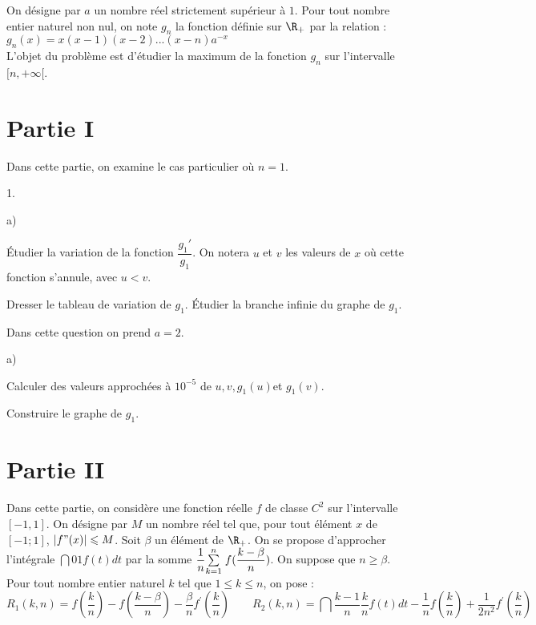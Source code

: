\documentclass[11pt]{article}%
\begin{document}
\noindent On désigne par $a$ un nombre réel strictement supérieur à
$1$.
Pour tout nombre entier naturel non nul, on note $g_{n}$ la fonction
définie
sur $\R_{+}$ par la relation : $g_{n}(x) = x(x-1)(x-2)...(x-n)a^{-x}$\\
L'objet du problème est d'étudier la maximum de la fonction $g_{n}$ sur
l'intervalle $[n, + \infty \lbrack $.

\section*{Partie I}

Dans cette partie, on examine le cas particulier où $n = 1$.

\begin{noliste}{1.}
 \setlength{\itemsep}{4mm}
\item 

\begin{noliste}{a)}
 \setlength{\itemsep}{2mm}
\item Étudier la variation de la fonction $\dfrac{g_{1}{\prime
}}{g_{1}} $.
On notera $u$ et $v$ les valeurs de $x$ où cette fonction s'annule,
avec $u<v $.

\item Dresser le tableau de variation de $g_{1}$. Étudier la branche
infinie
du graphe de $g_{1}$.
\end{noliste}

\item Dans cette question on prend $a = 2$.

\begin{noliste}{a)}
 \setlength{\itemsep}{2mm}
\item Calculer des valeurs approchées à $10^{-5}$ de $u,v,g_{1}(u)$et
$g_{1}(v)$.

\item Construire le graphe de $g_{1}$.
\end{noliste}
\end{noliste}

\section*{Partie II}

Dans cette partie, on considère une fonction réelle $f$ de classe
$C^{2}$
sur l'intervalle $[-1,1]$. On désigne par $M$ un nombre réel tel que,
pour
tout élément $x$ de $[-1;1]$, $\left| f"(x)\right| \leq M$.
Soit $\beta $ un élément de $\R_{+}$. On se propose d'approcher
l'intégrale $\dint{0}{1}f(t)dt$ par la somme $\dfrac{1}{n}\Sum{k =
1}{n}f(\dfrac{k-\beta }{n})$. On suppose que $n\geq 
\beta $. Pour tout nombre entier naturel $k$ tel que $1\leq k\leq n
$, on pose : 
\[
R_{1}(k,n) = f(\dfrac{k}{n})-f(\dfrac{k-\beta }{n})-\dfrac{\beta
}{n}f^{\prime
}(\dfrac{k}{n})\qquad R_{2}(k,n) =
\dint{\dfrac{k-1}{n}}{\dfrac{k}{n}}f(t)dt-\dfrac{1}{n}f(\dfrac{k}{n}) +
\dfrac{1}{2n^{2}}f^{\prime }(\dfrac{k}{n})
\]
\end{document}
